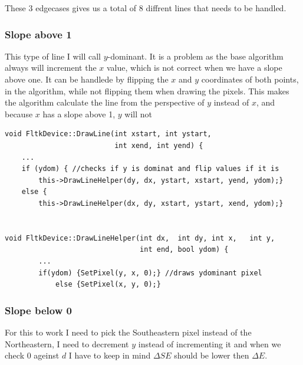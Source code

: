 \documentclass{article}
\begin{document}
These 3 edgecases gives us a total of 8 diffrent lines that needs
to be handled.

\subsubsection{Slope above 1} This type of line I will call $y$-dominant.
It is a problem as the base algorithm always will increment the 
$x$ value, which is not correct when we have a slope above one.
It can be handlede by flipping the $x$ and $y$ coordinates of both points,
in the algorithm, while not flipping them when drawing the pixels. 
This makes the algorithm calculate the line from the perspective
of $y$ instead of $x$, and because $x$ has a slope above 1, $y$ will not

\begin{verbatim}
void FltkDevice::DrawLine(int xstart, int ystart, 
                          int xend, int yend) {
    ...
    if (ydom) { //checks if y is dominat and flip values if it is
        this->DrawLineHelper(dy, dx, ystart, xstart, yend, ydom);}
    else {
        this->DrawLineHelper(dx, dy, xstart, ystart, xend, ydom);}


void FltkDevice::DrawLineHelper(int dx,  int dy, int x,   int y, 
                                int end, bool ydom) {
        ...
        if(ydom) {SetPixel(y, x, 0);} //draws ydominant pixel
            else {SetPixel(x, y, 0);}
\end{verbatim}

\subsubsection{Slope below 0} For this to work I need to pick the
Southeastern pixel instead of the Northeastern, I need to
decrement $y$ instead of incrementing it and when we check 0 
ageinst $d$ I have to keep in mind $\Delta SE$ should be lower then $\Delta E$. 
\end{document}
